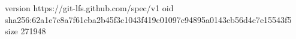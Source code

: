 version https://git-lfs.github.com/spec/v1
oid sha256:62a1e7c8a7f61cba2b45f3c1043f419c01097c94895a0143cb56d4c7e15543f5
size 271948
